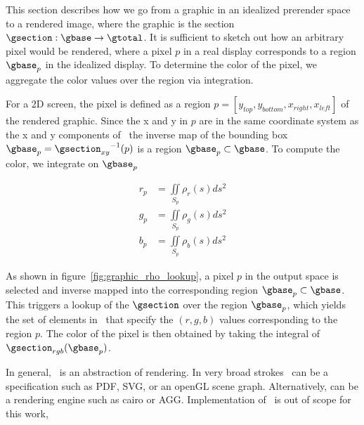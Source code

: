 \documentclass[../main.tex]{subfiles}
\begin{document}
This section describes how we go from a graphic in an idealized prerender space to a rendered image, where the graphic is the section $\gsection: \gbase \rightarrow \gtotal$. It is sufficient to sketch out how an arbitrary pixel would be rendered, where a pixel $p$ in a real display corresponds to a region $\gbase_p$ in the idealized display. To determine the color of the pixel, we aggregate the color values over the region via integration. 

For a 2D screen, the pixel is defined as a region $p=\left[y_{top}, y_{bottom}, x_{right}, x_{left}\right]$ of the rendered graphic. Since the x and y in $p$ are in the same coordinate system as the x and y components of \gfiber\,  the inverse map of the bounding box $\gbase_{p} ={\gsection_{xy}}^{-1}(p)$ is a region $\gbase_p \subset \gbase$. To compute the color, we integrate on $\gbase_p$

\begin{align}
    r_p &= \iint\limits_{S_p} \rho_r(s)ds^{2}\\
    g_p &= \iint\limits_{S_p} \rho_g(s)ds^{2}\\
    b_p &= \iint\limits_{S_p} \rho_b(s)ds^{2}
\end{align}

As shown in figure~\ref{fig:graphic_rho_lookup}, a pixel $p$ in the output space is selected and inverse mapped into the corresponding region $\gbase_p \subset \gbase$. This triggers a lookup of the $\gsection$ over the region $\gbase_p$, which yields the set of elements in \gfiber\ that specify the $(r, g, b)$ values corresponding to the region $p$. The color of the pixel is then obtained by taking the integral of $\gsection_{rgb}(\gbase_p)$. 

In general, \gsection\ is an abstraction of rendering. In very broad strokes \gsection\  can be a specification such as PDF\cite{bienz1993portable}, SVG\cite{quintScalable2003}, or an openGL scene graph\cite{CarsonOpenGL1997}. Alternatively, \gsection can be a rendering engine such as cairo\cite{CairographicsOrg} or AGG\cite{AntiGrainGeometry}. Implementation of \gsection\ is out of scope for this work,
\end{document}
